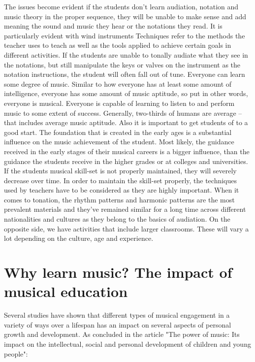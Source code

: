 The issues become evident if the students don’t learn audiation, notation and music theory in the proper sequence, they will be unable to make sense and add meaning the sound and music they hear or the notations they read. It is particularly evident with wind instruments Techniques refer to the methods the teacher uses to teach as well as the tools applied to achieve certain goals in different activities.\cite{audiation} If the students are unable to tonally audiate what they see in the notations, but still manipulate the keys or valves on the instrument as the notation instructions, the student will often fall out of tune.
Everyone can learn some degree of music. Similar to how everyone has at least some amount of intelligence, everyone has some amount of music aptitude, so put in other words, everyone is musical. Everyone is capable of learning to listen to and perform music to some extent of success.\cite{audiation} Generally, two-thirds of humans are average – that includes average music aptitude.
Also it is important to get students of to a good start. The foundation that is created in the early ages is a substantial influence on the music achievement of the student. Most likely, the guidance received in the early stages of their musical careers is a bigger influence, than the guidance the students receive in the higher grades or at colleges and universities. If the students musical skill-set is not properly maintained, they will severely decrease over time.
In order to maintain the skill-set properly, the techniques used by teachers have to be considered as
they are highly important. \cite{audiation}When it comes to tonation, the rhythm patterns and harmonic patterns are the most prevalent materials and they’ve remained similar for a long time across different nationalities and cultures as they belong to the basics of audiation. On the opposite side, we have activities that include larger classrooms. These will vary a lot depending on the culture, age and experience.\cite{audiation}\\


\section{Why learn music? The impact of musical education}
Several studies have shown that different types of musical engagement in a variety of ways over a lifespan has an impact on several aspects of personal growth and development. As concluded in the article "The power of music: Its impact on the intellectual, social and personal development of children and young people":\\

